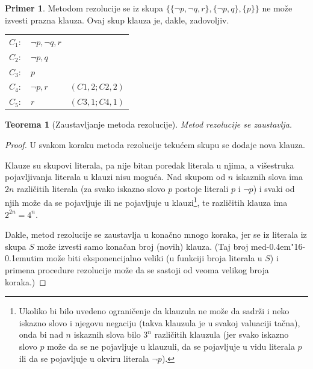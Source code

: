 \documentclass[12pt, a4paper, titlepage, twoside]{article}
\newtheorem{theorem}{Teorema}[section]
\theoremstyle{definition}
\newtheorem{pr}{\sc Primer}
\def\dj{d\kern-0.4em\char"16\kern-0.1em}
\begin{document}
\begin{pr}
Metodom rezolucije se iz skupa $\{\{\neg p, \neg q, r\}, \{\neg p, q\}, \{p\}\}$ ne mo\v ze
izvesti prazna klauza. Ovaj skup klauza je, dakle, zadovoljiv.
\begin{center}
\begin{tabular}{l l l}
	
	$C_1 :$ & $\neg p, \neg q, r$  \\
	
	$C_2 :$ & $\neg p, q$  \\
	
	$C_3 :$ & $p$  \\ \hline
	
	$C_4 :$ & $\neg p, r$ & $(C1, 2; C2, 2)$ \\
	
	$C_5 :$ & $r$ & $(C3, 1; C4, 1)$ \\

\end{tabular}
\end{center}

\end{pr}

\vspace{0.2cm}
\begin{theorem}[Zaustavljanje metoda rezolucije]
Metod rezolucije se zaustavlja.
\end{theorem}

\vspace{0.2cm}
\begin{proof}
U svakom koraku metoda rezolucije teku\'cem skupu se dodaje nova
klauza.

\noindent
Klauze su skupovi literala, pa nije bitan poredak literala u njima, a vi\v sestruka 
pojavljivanja literala u klauzi nisu mogu\'ca. Nad skupom od $n$
iskaznih slova ima $2n$ razli\v citih literala (za svako iskazno slovo $p$ postoje
literali $p$ i $\neg p$) i svaki od njih mo\v ze da se pojavljuje ili ne pojavljuje u
{klauzi\footnote{Ukoliko bi bilo uvedeno ograni\v cenje da klauzula ne mo\v ze da sadr\v zi 
i neko iskazno slovo i njegovu negaciju (takva klauzula je u svakoj valuaciji ta\v cna), 
onda bi nad $n$ iskaznih slova bilo $3^n$ razli\v citih klauzula (jer svako iskazno slovo 
$p$ mo\v ze da se ne pojavljuje u klauzuli, da se pojavljuje u vidu literala $p$ ili 
da se pojavljuje u okviru literala $\neg p$).}}, te razli\v citih klauza ima $2^{2n} = 4^n$.

\noindent
Dakle, metod rezolucije se zaustavlja u kona\v cno mnogo koraka, jer se iz
literala iz skupa $S$ mo\v ze izvesti samo kona\v can broj (novih) klauza. (Taj
broj me\dj{}utim mo\v ze biti eksponencijalno veliki (u funkciji broja literala u
$S$) i primena procedure rezolucije mo\v ze da se sastoji od veoma velikog
broja koraka.) 
\end{proof}
\end{document}
